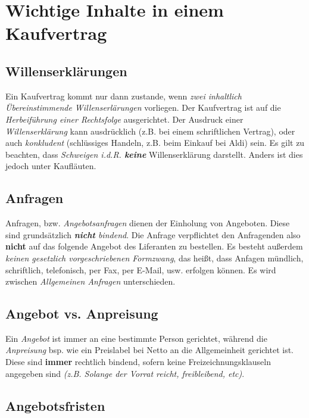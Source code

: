 \documentclass[a4paper, 12pt]{report}
\begin{document}
\section{Wichtige Inhalte in einem Kaufvertrag}

\subsection{Willenserklärungen}

Ein Kaufvertrag kommt nur dann zustande, wenn \emph{zwei inhaltlich 
Übereinstimmende Willenserlärungen} vorliegen. Der Kaufvertrag ist auf die 
\emph{Herbeiführung einer Rechtsfolge} ausgerichtet. Der Ausdruck einer 
\emph{Willenserklärung} kann ausdrücklich (z.B. bei einem schriftlichen 
Vertrag), oder auch \emph{konkludent} (schlüssiges Handeln, z.B. beim Einkauf 
bei Aldi) sein. Es gilt zu beachten, dass \emph{Schweigen i.d.R. \textbf{keine}}
Willenserklärung darstellt. Anders ist dies jedoch unter Kaufläuten. \\

\subsection{Anfragen}

Anfragen, bzw. \emph{Angebotsanfragen} dienen der Einholung von Angeboten. Diese
sind grundsätzlich \emph{\textbf{nicht} bindend}. Die Anfrage verpflichtet den 
Anfragenden also \textbf{nicht} auf das folgende Angebot des Liferanten zu 
bestellen. Es besteht außerdem \emph{keinen gesetzlich vorgeschriebenen 
Formzwang}, das heißt, dass Anfagen mündlich, schriftlich, telefonisch, per Fax, 
per E-Mail, usw. erfolgen können. Es wird zwischen \emph{Allgemeinen Anfragen} 
unterschieden. \\

\subsection{Angebot vs. Anpreisung}

Ein \emph{Angebot} ist immer an eine bestimmte Person gerichtet, während die 
\emph{Anpreisung} bsp. wie ein Preislabel bei Netto an die Allgemeinheit 
gerichtet ist. Diese sind \textbf{immer} rechtlich bindend, sofern keine 
Freizeichnungsklauseln angegeben sind \emph{(z.B. \glqq Solange der Vorrat 
reicht\grqq{}, \glqq freibleibend\grqq{}, etc)}.

\subsection{Angebotsfristen}
\end{document}
